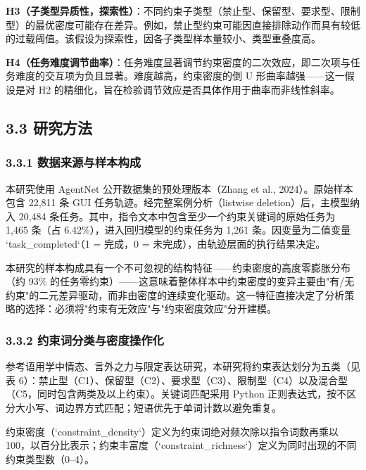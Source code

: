 \documentclass[12pt,a4paper,openany,oneside]{ctexrep}
\begin{document}
\textbf{H3（子类型异质性，探索性）}：不同约束子类型（禁止型、保留型、要求型、限制型）的最优密度可能存在差异。例如，禁止型约束可能因直接排除动作而具有较低的过载阈值。该假设为探索性，因各子类型样本量较小、类型重叠度高。

\textbf{H4（任务难度调节曲率）}：任务难度显著调节约束密度的二次效应，即二次项与任务难度的交互项为负且显著。难度越高，约束密度的倒 U 形曲率越强——这一假设是对 H2 的精细化，旨在检验调节效应是否具体作用于曲率而非线性斜率。

\subsection{3.3 研究方法}


\subsubsection{3.3.1 数据来源与样本构成}


本研究使用 AgentNet 公开数据集的预处理版本（Zhang et al., 2024）。原始样本包含 22,811 条 GUI 任务轨迹。经完整案例分析（listwise deletion）后，主模型纳入 20,484 条任务。其中，指令文本中包含至少一个约束关键词的原始任务为 1,465 条（占 6.42\%），进入回归模型的约束任务为 1,261 条。因变量为二值变量 `task\_completed`（1 = 完成，0 = 未完成），由轨迹层面的执行结果决定。

本研究的样本构成具有一个不可忽视的结构特征——约束密度的高度零膨胀分布（约 93\% 的任务零约束）——这意味着整体样本中约束密度的变异主要由"有/无约束"的二元差异驱动，而非由密度的连续变化驱动。这一特征直接决定了分析策略的选择：必须将"约束有无效应"与"约束密度效应"分开建模。

\subsubsection{3.3.2 约束词分类与密度操作化}


参考语用学中情态、言外之力与限定表达研究，本研究将约束表达划分为五类（见表 6）：禁止型（C1）、保留型（C2）、要求型（C3）、限制型（C4）以及混合型（C5，同时包含两类及以上约束）。关键词匹配采用 Python 正则表达式，按不区分大小写、词边界方式匹配；短语优先于单词计数以避免重复。

约束密度（`constraint\_density`）定义为约束词绝对频次除以指令词数再乘以 100，以百分比表示；约束丰富度（`constraint\_richness`）定义为同时出现的不同约束类型数（0–4）。
\end{document}
